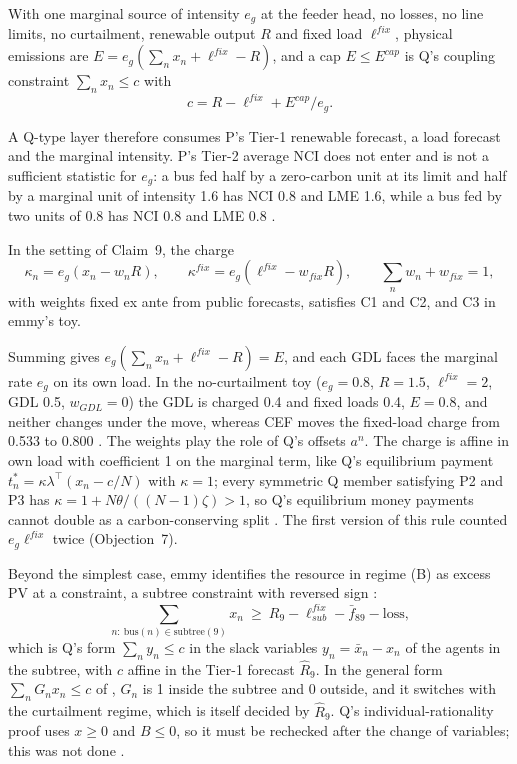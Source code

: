 \documentclass{article}
\begin{document}
\begin{claim}
With one marginal source of intensity \(e_g\) at the feeder head, no losses, no line limits, no curtailment, renewable output \(R\) and fixed load \(\ell^{fix}\), physical emissions are \(E=e_g(\sum_nx_n+\ell^{fix}-R)\), and a cap \(E\le E^{cap}\) is Q's coupling constraint \(\sum_nx_n\le c\) with
\[
c=R-\ell^{fix}+E^{cap}/e_g.
\]
\end{claim}

A Q-type layer therefore consumes P's Tier-1 renewable forecast, a load forecast and the marginal intensity. P's Tier-2 average NCI does not enter and is not a sufficient statistic for \(e_g\): a bus fed half by a zero-carbon unit at its limit and half by a marginal unit of intensity 1.6 has NCI 0.8 and LME 1.6, while a bus fed by two units of 0.8 has NCI 0.8 and LME 0.8 .

\begin{claim}
In the setting of Claim~9, the charge
\[
\kappa_n=e_g(x_n-w_nR),\qquad \kappa^{fix}=e_g(\ell^{fix}-w_{fix}R),\qquad \sum_nw_n+w_{fix}=1,
\]
with weights fixed ex ante from public forecasts, satisfies C1 and C2, and C3 in emmy's toy. 
\end{claim}

Summing gives \(e_g(\sum_nx_n+\ell^{fix}-R)=E\), and each GDL faces the marginal rate \(e_g\) on its own load. In the no-curtailment toy (\(e_g=0.8\), \(R=1.5\), \(\ell^{fix}=2\), GDL 0.5, \(w_{GDL}=0\)) the GDL is charged 0.4 and fixed loads 0.4, \(E=0.8\), and neither changes under the move, whereas CEF moves the fixed-load charge from 0.533 to 0.800 . The weights play the role of Q's offsets \(a^n\). The charge is affine in own load with coefficient 1 on the marginal term, like Q's equilibrium payment \(t^*_n=\kappa\lambda^\top(x_n-c/N)\) with \(\kappa=1\); every symmetric Q member satisfying P2 and P3 has \(\kappa=1+N\theta/((N-1)\zeta)>1\), so Q's equilibrium money payments cannot double as a carbon-conserving split . The first version of this rule counted \(e_g\ell^{fix}\) twice (Objection~7).

Beyond the simplest case, emmy identifies the resource in regime (B) as excess PV at a constraint, a subtree constraint with reversed sign :
\[
\sum_{n:\ \mathrm{bus}(n)\in\mathrm{subtree}(9)}x_n\ \ge\ R_9-\ell^{fix}_{sub}-\bar f_{89}-\mathrm{loss},
\]
which is Q's form \(\sum_ny_n\le c\) in the slack variables \(y_n=\bar x_n-x_n\) of the agents in the subtree, with \(c\) affine in the Tier-1 forecast \(\hat R_9\). In the general form \(\sum_nG_nx_n\le c\) of , \(G_n\) is 1 inside the subtree and 0 outside, and it switches with the curtailment regime, which is itself decided by \(\hat R_9\). Q's individual-rationality proof uses \(x\ge0\) and \(B\le0\), so it must be rechecked after the change of variables; this was not done .
\end{document}
